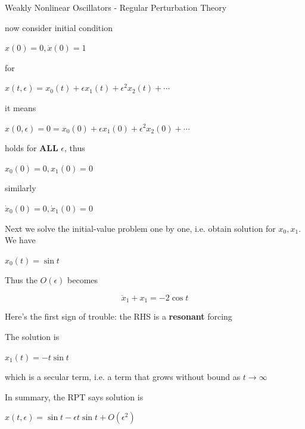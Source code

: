 \documentclass[9pt,aspectratio=43,mathserif,table]{beamer}
\begin{document}
\begin{frame}[label=current]{Weakly Nonlinear Oscillators - Regular Perturbation Theory}

  \begin{multicols}{2}
    now consider initial condition

    $x(0) = 0, \dot x(0) = 1$

    for 
  
    $x(t,\epsilon) = x_0(t) + \epsilon x_1(t) + \epsilon^2 x_2(t) + \cdots$

    it means

    $x(0,\epsilon) = 0 = x_0(0) + \epsilon x_1(0) + \epsilon^2 x_2(0) + \cdots$

    holds for \textbf{ALL} $\epsilon$, thus

    $x_0(0) = 0, x_1(0) = 0$

    similarly 
    
    $\dot x_0(0) = 0, \dot x_1(0) = 0$

    Next we solve the initial-value problem one by one, i.e. obtain solution for $x_0, x_1$. We have

    $x_0(t) = \sin t$

    Thus the $O(\epsilon)$ becomes
    
    $$\ddot x_1 + x_1 = -2 \cos t$$

    Here's the first sign of trouble: the RHS is a \textbf{resonant} forcing

    The solution is 

    $x_1(t) = -t \sin t$

    which is a secular term, i.e. a term that grows without bound as $t \rightarrow \infty$

    In summary, the RPT says solution is 
    
    $x(t, \epsilon) = \sin t - \epsilon t \sin t + O(\epsilon^2)$

  \end{multicols}
\end{frame}
\end{document}
